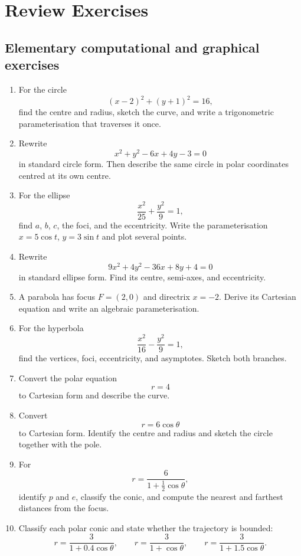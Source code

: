 \section{Review Exercises}

\subsection{Elementary computational and graphical exercises}

\begin{enumerate}

\item For the circle
\[
(x-2)^2+(y+1)^2=16,
\]
find the centre and radius, sketch the curve, and write a trigonometric
parameterisation that traverses it once.

\item Rewrite
\[
x^2+y^2-6x+4y-3=0
\]
in standard circle form. Then describe the same circle in polar coordinates
centred at its own centre.

\item For the ellipse
\[
\frac{x^2}{25}+\frac{y^2}{9}=1,
\]
find $a$, $b$, $c$, the foci, and the eccentricity. Write the parameterisation
$x=5\cos t$, $y=3\sin t$ and plot several points.

\item Rewrite
\[
9x^2+4y^2-36x+8y+4=0
\]
in standard ellipse form. Find its centre, semi-axes, and eccentricity.

\item A parabola has focus $F=(2,0)$ and directrix $x=-2$. Derive its Cartesian
equation and write an algebraic parameterisation.

\item For the hyperbola
\[
\frac{x^2}{16}-\frac{y^2}{9}=1,
\]
find the vertices, foci, eccentricity, and asymptotes. Sketch both branches.

\item Convert the polar equation
\[
r=4
\]
to Cartesian form and describe the curve.

\item Convert
\[
r=6\cos\theta
\]
to Cartesian form. Identify the centre and radius and sketch the circle together
with the pole.

\item For
\[
r=\frac{6}{1+\frac12\cos\theta},
\]
identify $p$ and $e$, classify the conic, and compute the nearest and farthest
distances from the focus.

\item Classify each polar conic and state whether the trajectory is bounded:
\[
r=\frac{3}{1+0.4\cos\theta},
\qquad
r=\frac{3}{1+\cos\theta},
\qquad
r=\frac{3}{1+1.5\cos\theta}.
\]

\end{enumerate}

